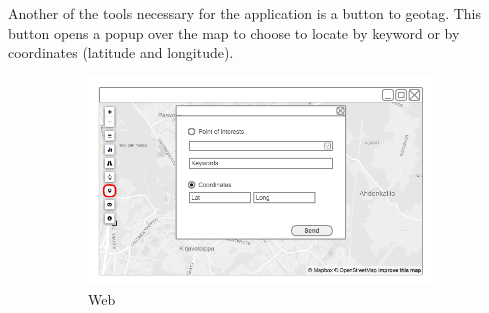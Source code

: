 
Another of the tools necessary for the application is a button to geotag. This button opens a popup over the map to choose to locate by keyword or by coordinates (latitude and longitude).

\begin{figure}[ht]
    \centering
    \begin{subfigure}[b]{0.6\textwidth}
        \includegraphics[width=\textwidth]
          {img/c02-application/png/web-basemap-focus.png}
        \caption{Web}
    \end{subfigure}
    ~
    \begin{subfigure}[b]{0.2\textwidth}

\end{subfigure}
\end{figure}
